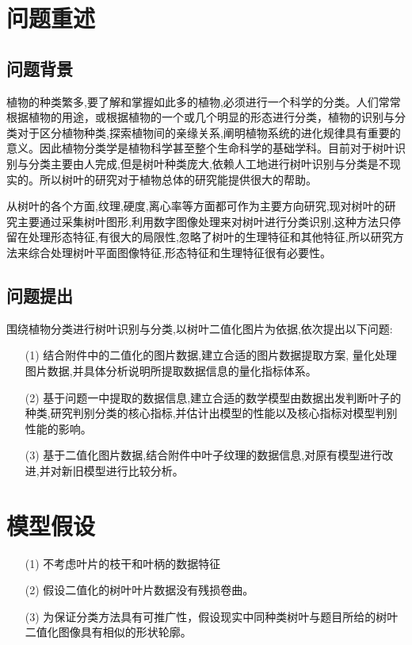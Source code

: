 \documentclass{whutmod}
\begin{document}
	\section{问题重述}	
	\subsection{问题背景}
    植物的种类繁多,要了解和掌握如此多的植物,必须进行一个科学的分类。人们常常根据植物的用途，或根据植物的一个或几个明显的形态进行分类，植物的识别与分类对于区分植物种类,探索植物间的亲缘关系,阐明植物系统的进化规律具有重要的意义。因此植物分类学是植物科学甚至整个生命科学的基础学科。目前对于树叶识别与分类主要由人完成,但是树叶种类庞大,依赖人工地进行树叶识别与分类是不现实的。所以树叶的研究对于植物总体的研究能提供很大的帮助。
    
    从树叶的各个方面,纹理,硬度,离心率等方面都可作为主要方向研究,现对树叶的研究主要通过采集树叶图形,利用数字图像处理来对树叶进行分类识别,这种方法只停留在处理形态特征,有很大的局限性,忽略了树叶的生理特征和其他特征,所以研究方法来综合处理树叶平面图像特征,形态特征和生理特征很有必要性。
    
    

	\subsection{问题提出}
    围绕植物分类进行树叶识别与分类,以树叶二值化图片为依据,依次提出以下问题:
		 
	\begin{itemize}
	\item [(1)] 结合附件中的二值化的图片数据,建立合适的图片数据提取方案, 量化处理图片数据,并具体分析说明所提取数据信息的量化指标体系。
	\item [(2)] 基于问题一中提取的数据信息,建立合适的数学模型由数据出发判断叶子的种类,研究判别分类的核心指标,并估计出模型的性能以及核心指标对模型判别性能的影响。
	\item [(3)] 基于二值化图片数据,结合附件中叶子纹理的数据信息,对原有模型进行改进,并对新旧模型进行比较分析。
	\end{itemize}
	
	\section{模型假设}
	\begin{itemize}                                             
		\item [(1)] 不考虑叶片的枝干和叶柄的数据特征
		\item [(2)] 假设二值化的树叶叶片数据没有残损卷曲。
		\item [(3)] 为保证分类方法具有可推广性，假设现实中同种类树叶与题目所给的树叶二值化图像具有相似的形状轮廓。
	\end{itemize}
	
\end{document}
